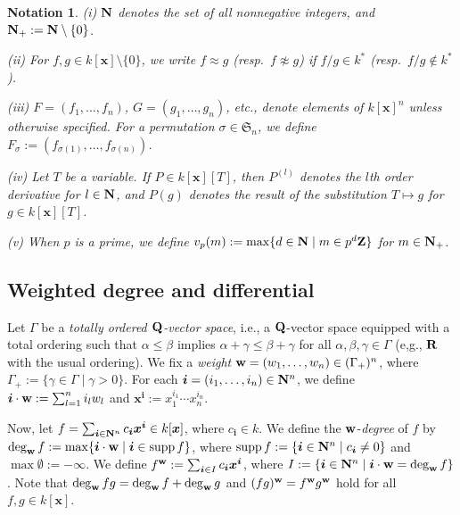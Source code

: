 \documentclass{amsart}
\theoremstyle{plain}
\newtheorem{notation}{Notation}
\theoremstyle{definition}
\newcommand{\zs}{\{ 0\} }
\newcommand{\sm}{\setminus}
\newcommand{\nd}{\noindent}
\newcommand{\R}{{\bf R}}
\newcommand{\Q}{{\bf Q}}
\newcommand{\Z}{{\bf Z}}
\newcommand{\N}{{\bf N}}
\newcommand{\x}{{\boldsymbol x}}
\newcommand{\w}{{\bf w}}
\newcommand{\bi}{{\boldsymbol i}}
\newcommand{\kx}{k[\x]}
\newcommand{\degww  }{\mathop{\rm deg}_{\w }\nolimits}
\newcommand{\supp }{\mathop{\rm supp}\nolimits}
\newcommand{\sym}{\mathfrak{S}}
\begin{document}
\begin{notation}\label{notation:intro}\rm 
(i) 
$\N $ denotes the set of all nonnegative integers, 
and $\N _+:=\N \sm \zs $. 



\nd (ii) 
For $f,g\in \kx \sm \zs $, 
we write $f\approx g$ 
(resp.\ $f\not\approx g$) if 
$f/g\in k^*$ 
(resp.\ $f/g\not\in k^*$). 


\nd (iii) 
$F=(f_1,\ldots ,f_n)$, $G=(g_1,\ldots ,g_n)$, etc., 
denote elements of $\kx ^n$ 
unless otherwise specified. 
For a permutation $\sigma \in \sym _n$, 
we define 
$F_\sigma :=(f_{\sigma (1)},\ldots ,f_{\sigma (n)})$. 


\nd (iv) 
Let $T$ be a variable. 
If $P\in \kx [T]$, 
then $P^{(l)}$ denotes the $l$th order derivative for $l\in \N $, 
and $P(g)$ denotes the result of the substitution 
$T\mapsto g$ for $g\in \kx [T]$. 



\nd (v) 
When $p$ is a prime, 
we define $v_p(m):=\max \{ d\in \N \mid m\in p^d\Z\} $ 
for $m\in \N _+$. 
\end{notation}



\subsection{Weighted degree and differential}\label{subsetc:w-degree}


Let $\Gamma $ be a 
{\it totally ordered $\Q $-vector space}, 
i.e., a $\Q $-vector space 
equipped with a total ordering such that 
$\alpha \le \beta $ implies 
$\alpha +\gamma \le \beta +\gamma $ 
for all $\alpha ,\beta ,\gamma \in \Gamma $ 
(e,g., $\R $ with the usual ordering). 
We fix a {\it weight} 
$\w =(w_1,\ldots ,w_n)\in (\Gamma _+)^n$, 
where $\Gamma _+:=\{ \gamma \in \Gamma \mid \gamma >0\} $. 
For each $\bi =(i_1,\ldots ,i_n)\in \N ^n$, 
we define 
$\bi \cdot \w :=\sum _{l=1}^ni_lw_l$ 
and $\x ^{\bi }:=x_1^{i_1}\cdots x_n^{i_n}$. 


Now, 
let $f=\sum _{\bi \in \N ^n}c_{\bi }\x ^{\bi }\in \kx $, 
where $c_{\bi }\in k$. 
We define the $\w $-{\it degree} of $f$ by 
$\degww  f:=\max \{ \bi \cdot \w \mid \bi \in \supp f\} $, 
where $\supp f:=\{ \bi \in \N ^n\mid c_{\bi }\ne 0\} $ and 
$\max \emptyset :=-\infty $. 
We define $f^{\w }:=\sum _{\bi \in I}c_{\bi }\x ^{\bi }$, 
where $I:=\{ \bi \in \N ^n\mid \bi \cdot \w =\degww f\} $. 
Note that $\degww fg=\degww f+\degww g$ and 
$(fg)^{\w }=f^{\w }g^{\w }$ hold for all $f,g\in \kx $. 
\end{document}
